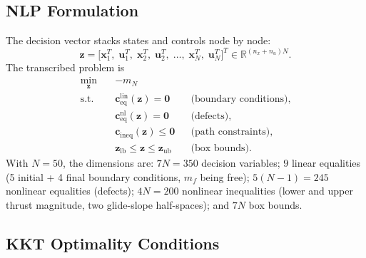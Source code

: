 \documentclass[../main.tex]{subfiles}
\begin{document}
\subsection{NLP Formulation}\label{sec:nlp}

The decision vector stacks states and controls node by node:
\begin{equation}
    \mathbf{z} = \bigl[\mathbf{x}_1^T,\; \mathbf{u}_1^T,\;
                       \mathbf{x}_2^T,\; \mathbf{u}_2^T,\;
                       \ldots,\;
                       \mathbf{x}_N^T,\; \mathbf{u}_N^T\bigr]^T \in \mathbb{R}^{(n_x+n_u)N}.
    \label{eq:dec_vec}
\end{equation}
The transcribed problem is
\begin{equation}
\begin{aligned}
    \min_{\mathbf{z}} \quad & -m_N \\[2pt]
    \text{s.t.}\quad
    & \mathbf{c}_{\mathrm{eq}}^{\mathrm{lin}}(\mathbf{z}) = \mathbf{0}     && \text{(boundary conditions)}, \\
    & \mathbf{c}_{\mathrm{eq}}^{\mathrm{nl}}(\mathbf{z}) = \mathbf{0}      && \text{(defects)}, \\
    & \mathbf{c}_{\mathrm{ineq}}(\mathbf{z}) \leq \mathbf{0}              && \text{(path constraints)}, \\
    & \mathbf{z}_{\mathrm{lb}} \leq \mathbf{z} \leq \mathbf{z}_{\mathrm{ub}} && \text{(box bounds)}.
\end{aligned}
\label{eq:nlp}
\end{equation}
With $N = 50$, the dimensions are: $7N = 350$ decision variables; $9$ linear equalities (5 initial + 4 final boundary conditions, $m_f$ being free); $5(N-1) = 245$ nonlinear equalities (defects); $4N = 200$ nonlinear inequalities (lower and upper thrust magnitude, two glide-slope half-spaces); and $7N$ box bounds.

\subsection{KKT Optimality Conditions}\label{sec:kkt}
\end{document}
